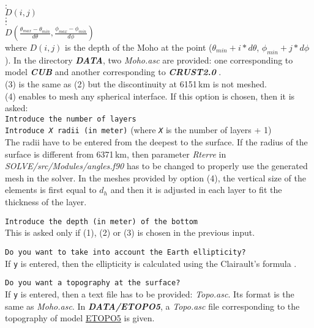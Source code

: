 \begin{itemize}[topsep=2pt,itemsep=4pt]
\hspace*{1cm} $ : $\\
\hspace*{1cm} $ D(i,j) $\\
\hspace*{1cm} $ : $\\
\hspace*{1cm} $ : $\\
\hspace*{1cm} $ D(\frac{\theta_{max}-\theta_{min}}{d\theta},\frac{\phi_{max}-\phi_{min}}{d\phi}) $\\
where $D(i,j)$ is the depth of the Moho at the point ($\theta_{min}+i*d\theta$, $\phi_{min}+j*d\phi$). In the directory \textit{\bfseries DATA}, two \textit{Moho.asc} are provided: one corresponding to model \textit{\bfseries CUB}  and another corresponding to \textit{\bfseries CRUST2.0} .\\
(3) is the same as (2) but the discontinuity at 6151\,km is not meshed.\\
(4) enables to mesh any spherical interface. If this option is chosen, then it is asked:\\
\hspace*{0.6cm} \texttt{Introduce the number of layers}\\
\hspace*{0.6cm} \texttt{Introduce \textit{X} radii (in meter)} (where \texttt{\textit{X}} is the number of layers + 1)\\
The radii have to be entered from the deepest to the surface. If the radius of the surface is different from 6371\,km, then parameter \textit{Rterre} in \textit{SOLVE/src/Modules/angles.f90} has to be changed to properly use the generated mesh in the solver. In the meshes provided by option (4), the vertical size of the elements is first equal to $d_h$ and then it is adjusted in each layer to fit the thickness of the layer.

\texttt{Introduce the depth (in meter) of the bottom}\\
This is asked only if (1), (2) or (3) is chosen in the previous input.

\texttt{Do you want to take into account the Earth ellipticity?}\\
If \texttt{y} is entered, then the ellipticity is calculated using the Clairault's formula .

\texttt{Do you want a topography at the surface?}\\
If \texttt{y} is entered, then a text file has to be provided: \textit{Topo.asc}. Its format is the same as \textit{Moho.asc}. In \textit{\bfseries DATA/ETOPO5}, a \textit{Topo.asc} file corresponding to the topography of model \href{www.ngdc.noaa.gov/mgg/global/etopo5.HTML}{ETOPO5} is given.


\end{itemize}
